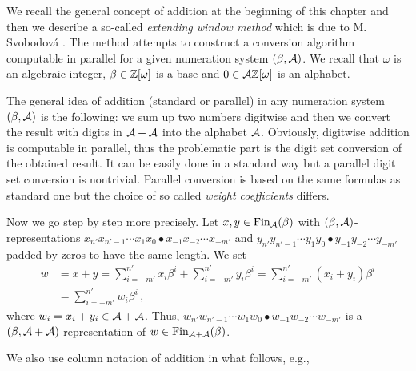 
We recall the general concept of addition at the beginning of this chapter and then we describe a so-called \emph{extending window method} which is due to M. Svobodov\'a \cite{milena}. The method attempts to construct a conversion algorithm computable in parallel for a given numeration system $(\beta,\mathcal{A})$. We recall that $\omega$ is an algebraic integer, $\beta \in \mathbb{Z}[\omega]$ is a base and $0\in\mathcal{A}\mathbb{Z}[\omega]$ is an alphabet. 


The general idea of addition (standard or parallel) in any numeration system $(\beta,\mathcal{A})$ is the following: we sum up two numbers digitwise and then we convert the result with digits in $\mathcal{A}+\mathcal{A}$ into the alphabet $\mathcal{A}$. Obviously, digitwise addition is computable in parallel, thus the problematic part is the digit set conversion of the obtained result. It can be easily done in a standard way but a parallel digit set conversion is nontrivial. Parallel conversion is based on the same  formulas as standard one but the choice of so called \emph{weight coefficients} differs.

Now we go step by step more precisely. Let $x,y \in \text{Fin}_{\mathcal{A}}(\beta)$ with $(\beta,\mathcal{A})$-representations $x_{n'}x_{{n'}-1}\cdots x_1 x_0\bullet x_{-1} x_{-2} \cdots x_{-m'}$ and $y_{n'}y_{{n'}-1}\cdots y_1 y_0\bullet y_{-1} y_{-2} \cdots y_{-m'}$ padded by zeros to have the same length. We set 
  \begin{align*}
    w&=x+y =\sum_{i=-m'}^{n'} x_i\beta^i + \sum_{i=-m'}^{n'} y_i\beta^i = \sum_{i=-m'}^{n'} (x_i+y_i)\beta^i \\
    &=\sum_{i=-m'}^{n'} w_i\beta^i \,,
  \end{align*}
  where $w_i=x_i+y_i \in \mathcal{A} +\mathcal{A}$. Thus, $w_{n'} w_{{n'}-1}\cdots w_1 w_0 \bullet w_{-1} w_{-2} \cdots w_{-m'}$ is a  $(\beta, \mathcal{A}+\mathcal{A})$-representation of $w\in \text{Fin}_{\mathcal{A}+\mathcal{A}}(\beta)$. 

We also use column notation of addition in what follows, e.g.,    
 
